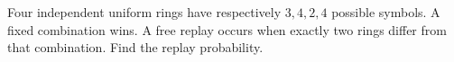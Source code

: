 Four independent uniform rings have respectively $3,4,2,4$ possible symbols. A fixed combination wins. A free replay occurs when exactly two rings differ from that combination. Find the replay probability.
